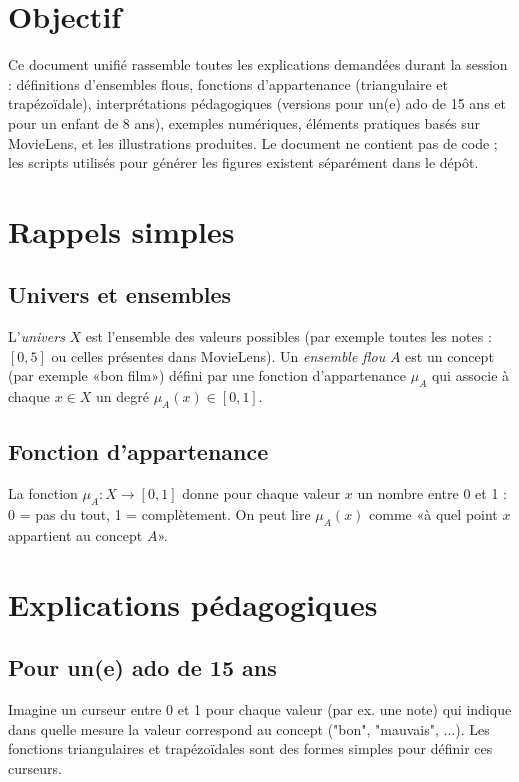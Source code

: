 \documentclass[a4paper,11pt]{article}
\author{Généré par l'assistant}
\date{\today}
\begin{document}
\maketitle

\section*{Objectif}
Ce document unifié rassemble toutes les explications demandées durant la session : définitions d'ensembles flous, fonctions d'appartenance (triangulaire et trapézoïdale), interprétations pédagogiques (versions pour un(e) ado de 15 ans et pour un enfant de 8 ans), exemples numériques, éléments pratiques basés sur MovieLens, et les illustrations produites. Le document ne contient pas de code ; les scripts utilisés pour générer les figures existent séparément dans le dépôt.

\section{Rappels simples}
\subsection{Univers et ensembles}
L'\emph{univers} $X$ est l'ensemble des valeurs possibles (par exemple toutes les notes : $[0,5]$ ou celles présentes dans MovieLens). Un \emph{ensemble flou} $A$ est un concept (par exemple «bon film») défini par une fonction d'appartenance $\mu_A$ qui associe à chaque $x\in X$ un degré $\mu_A(x)\in[0,1]$.

\subsection{Fonction d'appartenance}
La fonction $\mu_A:X\to[0,1]$ donne pour chaque valeur $x$ un nombre entre 0 et 1 : 0 = pas du tout, 1 = complètement. On peut lire $\mu_A(x)$ comme «à quel point $x$ appartient au concept $A$».

\section{Explications pédagogiques}
\subsection*{Pour un(e) ado de 15 ans}
Imagine un curseur entre 0 et 1 pour chaque valeur (par ex. une note) qui indique dans quelle mesure la valeur correspond au concept ("bon", "mauvais", ...). Les fonctions triangulaires et trapézoïdales sont des formes simples pour définir ces curseurs.
\end{document}
